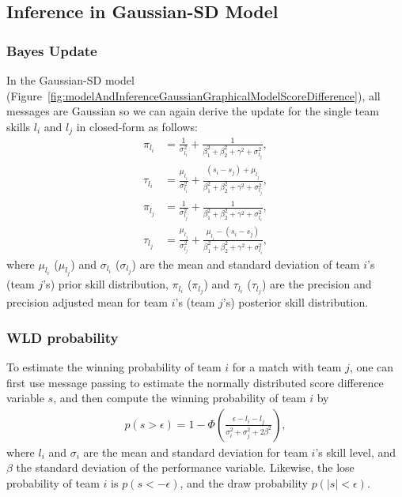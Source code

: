 \subsection{Inference in Gaussian-SD Model}

\subsubsection{Bayes Update} 
In the Gaussian-SD model
(Figure~\ref{fig:modelAndInferenceGaussianGraphicalModelScoreDifference}),
all messages are Gaussian so we can again derive the update
for the single team skills $l_i$ and $l_j$ in closed-form
as follows:
\begin{align}
  \pi_{l_{i}}  &=  \frac{1}{\sigma_{l_{i}}^2} + \frac{1}{\beta_1^2+\beta_2^2+\gamma^2+\sigma_{l_{j}}^2},  \nonumber \\
  \tau_{l_{i}} &=    \frac{\mu_{l_{i}}}{\sigma_{l_{i}}^2} + \frac{(s_i-s_j)+\mu_{l_{j}}}{\beta_1^2+\beta_2^2+\gamma^2+\sigma_{l_{j}}^2}, \nonumber    \\
  \pi_{l_{j}}  &=    \frac{1}{\sigma_{l_{j}}^2} + \frac{1}{\beta_1^2+\beta_2^2+\gamma^2+\sigma_{l_{i}}^2}, \nonumber \\
  \tau_{l_{j}} &=    \frac{\mu_{l_{j}}}{\sigma_{l_{j}}^2} + \frac{\mu_{l_{i}}-(s_i-s_j)}{\beta_1^2+\beta_2^2+\gamma^2+\sigma_{l_{i}}^2},
 \end{align}
where $\mu_{l_i}$ ($\mu_{l_j}$) and $\sigma_{l_i}$
      ($\sigma_{l_j}$) are the mean and standard deviation of team
      $i$'s (team $j$'s) prior skill distribution,
$\pi_{l_{i}}$ ($\pi_{l_{j}}$) and $\tau_{l_{i}}$
      ($\tau_{l_{j}}$) are the precision and precision adjusted mean
      for team $i$'s (team $j$'s) posterior skill distribution.

\subsubsection{WLD probability} 
To estimate the winning probability of team $i$ for a match with team $j$, one can first use message passing to estimate the normally distributed score difference variable $s$, and then compute the winning probability of team $i$ by
\begin{align}
  p(s>\epsilon) = 1 -
  \Phi\left(\frac{\epsilon-l_i-l_j}{\sigma_i^2+\sigma_j^2+2 \beta^2}\right),
\end{align}
where $l_i$ and $\sigma_i$ are the mean and standard deviation for
team $i$'s skill level, and $\beta$ the standard deviation of the
performance variable. Likewise, the lose probability of team $i$ is $p(s<-\epsilon)$, and the draw probability $p(|s|<\epsilon)$.

